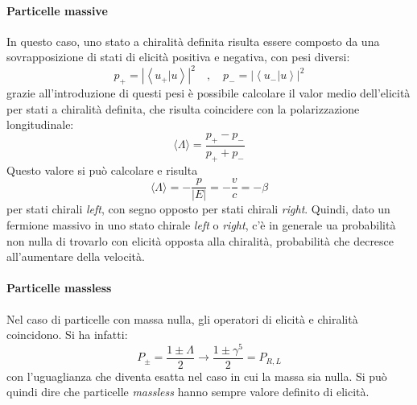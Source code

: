 \documentclass{subnucbo}
\begin{document}
\paragraph{Particelle massive} In questo caso, uno stato a chiralità definita risulta essere composto da una sovrapposizione di stati di elicità positiva e negativa, con pesi diversi:
\begin{equation}
        p_{+} = \left| \left\langle u _ { + } | u \right\rangle \right| ^ { 2 } \quad , \quad p_{-} = \left| \left\langle u _ { - } | u \right\rangle \right| ^ { 2 }
\end{equation}
grazie all'introduzione di questi pesi è possibile calcolare il valor medio dell'elicità per stati a chiralità definita, che risulta coincidere con la polarizzazione longitudinale:
\begin{equation}
        \langle \Lambda \rangle = \frac { p_{+} - p_{-}} { p_{+} + p_{-} }
        \label{eq:mean_value_helicity}
\end{equation}
Questo valore si può calcolare e risulta
\begin{equation}
        \langle \Lambda \rangle = - \frac { p } { | E | } = - \frac { v } { c } = - \beta
\end{equation}
per stati chirali \textit{left}, con segno opposto per stati chirali \textit{right}. Quindi, dato un fermione massivo in uno stato chirale \textit{left} o \textit{right}, c'è in generale ua probabilità non nulla di trovarlo con elicità opposta alla chiralità, probabilità che decresce all'aumentare della velocità.
\paragraph{Particelle massless} Nel caso di particelle con massa nulla, gli operatori di elicità e chiralità coincidono.
Si ha infatti:
\begin{equation}
        P _ { \pm } = \frac { 1 \pm \Lambda } { 2 } \rightarrow \frac { 1 \pm \gamma ^ { 5 } } { 2 } = P _ { R , L }
\end{equation}
con l'uguaglianza che diventa esatta nel caso in cui la massa sia nulla. Si può quindi dire che particelle \textit{massless} hanno sempre valore definito di elicità.
\end{document}
